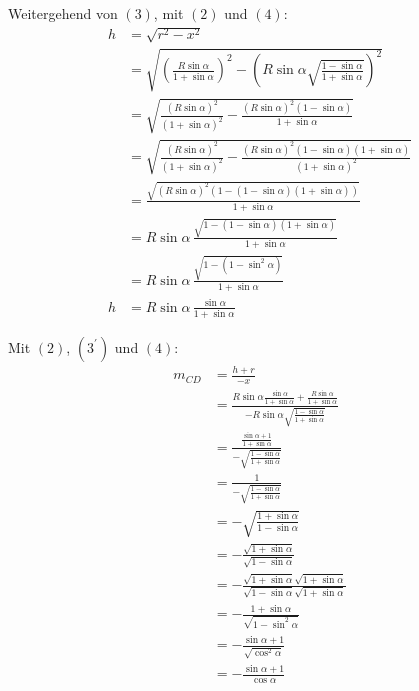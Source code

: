 \begin{samepage}
	Weitergehend von $(3)$, mit $(2)$ und $(4)$: \nopagebreak
	\begin{align*}
		h &= \sqrt{r^2-x^2} \\
		&= \sqrt{\left(\frac{R\sin\alpha}{1+\sin\alpha}\right)^2 - \left(R\sin\alpha\sqrt{\frac{1-\sin\alpha}{1+\sin\alpha}}\right)^2} \\
		&= \sqrt{\frac{(R\sin\alpha)^2}{(1+\sin\alpha)^2} - \frac{(R\sin\alpha)^2(1-\sin\alpha)}{1+\sin\alpha}} \\
		&= \sqrt{\frac{(R\sin\alpha)^2}{(1+\sin\alpha)^2} - \frac{(R\sin\alpha)^2(1-\sin\alpha)(1+\sin\alpha)}{(1+\sin\alpha)^2}} \\
		&= \frac{\sqrt{(R\sin\alpha)^2(1-(1-\sin\alpha)(1+\sin\alpha))}}{1+\sin\alpha} \\
		&= R\sin\alpha \, \frac{\sqrt{1-(1-\sin\alpha)(1+\sin\alpha)}}{1+\sin\alpha} \\
		&= R\sin\alpha \, \frac{\sqrt{1-(1-\sin^2\alpha)}}{1+\sin\alpha} \\
		h &= R\sin\alpha \, \frac{\sin\alpha}{1+\sin\alpha} \tag{$3^\prime$}
	\end{align*}
\end{samepage}
\begin{samepage}
	Mit $(2)$, $(3^\prime)$ und $(4)$: \nopagebreak
	\begin{align*}
		m_{CD} &= \frac{h+r}{-x} \\
		&= \frac{R\sin\alpha \frac{\sin\alpha}{1+\sin\alpha} + \frac{R\sin\alpha}{1+\sin\alpha}}{-R\sin\alpha\sqrt{\frac{1-\sin\alpha}{1+\sin\alpha}}} \\
		&= \frac{\frac{\sin\alpha+1}{1+\sin\alpha}}{-\sqrt{\frac{1-\sin\alpha}{1+\sin\alpha}}} \\
		&= \frac{1}{-\sqrt{\frac{1-\sin\alpha}{1+\sin\alpha}}} \\
		&= -\sqrt{\frac{1+\sin\alpha}{1-\sin\alpha}} \\
		&= -\frac{\sqrt{1+\sin\alpha}}{\sqrt{1-\sin\alpha}} \\
		&= -\frac{\sqrt{1+\sin\alpha}\sqrt{1+\sin\alpha}}{\sqrt{1-\sin\alpha}\sqrt{1+\sin\alpha}} \\
		&= -\frac{1+\sin\alpha}{\sqrt{1 - \sin^2\alpha}} \\
		&= -\frac{\sin\alpha+1}{\sqrt{\cos^2\alpha}} \\[15pt]
		&= -\frac{\sin\alpha+1}{\cos\alpha}
	\end{align*}
\end{samepage}
\goodbreak

